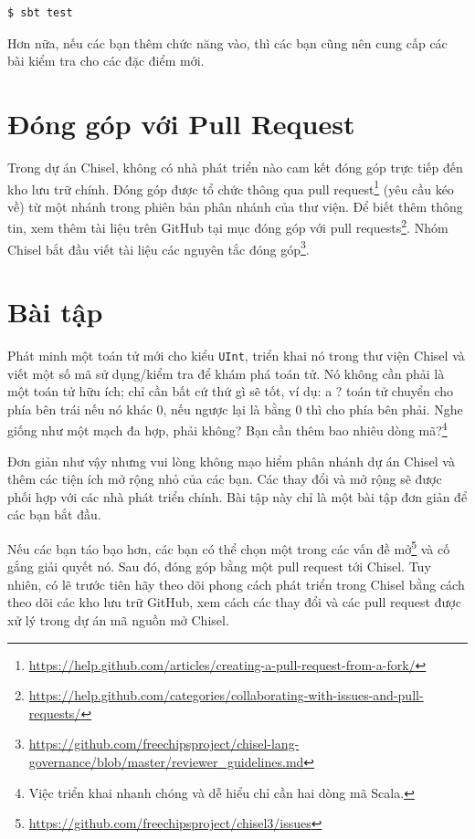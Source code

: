 \documentclass[%
    10pt,
    headinclude, footexclude,
    openright, %
    notitlepage,
    cleardoubleempty,
    headsepline,
    pointlessnumbers,
    bibtotoc, idxtotoc,
    ]{scrbook}
\newcommand{\code}[1]{{\small{\texttt{#1}}}}
\newcommand{\myref}[2]{\href{#1}{#2}}
\renewcommand{\myref}[2]{{#2}{\footnote{\url{#1}}}}
\begin{document}
\begin{verbatim}
$ sbt test
\end{verbatim}

Hơn nữa, nếu các bạn thêm chức năng vào, thì các bạn cũng nên cung cấp các bài kiểm tra cho các đặc điểm mới.

\section{Đóng góp với Pull Request}

Trong dự án Chisel, không có nhà phát triển nào cam kết đóng góp trực tiếp đến kho lưu trữ chính. Đóng góp được tổ chức thông qua 
\myref{https://help.github.com/articles/creating-a-pull-request-from-a-fork/}{pull request} (yêu cầu kéo về)
từ một nhánh trong phiên bản phân nhánh của thư viện.
Để biết thêm thông tin, xem thêm tài liệu trên GitHub tại mục
\myref{https://help.github.com/categories/collaborating-with-issues-and-pull-requests/}{đóng góp với pull requests}.
Nhóm Chisel bắt đầu viết tài liệu 
\myref{https://github.com/freechipsproject/chisel-lang-governance/blob/master/reviewer_guidelines.md}{các nguyên tắc đóng góp}.

\section{Bài tập}

Phát minh một toán tử mới cho kiểu \code{UInt}, triển khai nó trong thư viện Chisel và viết một số mã sử dụng/kiểm tra để khám phá toán tử. Nó không cần phải là một toán tử hữu ích; chỉ cần bất cứ thứ gì sẽ tốt, ví dụ: a ? toán tử chuyển cho phía bên trái nếu nó khác 0, nếu ngược lại là bằng 0 thì cho phía bên phải. Nghe giống như một mạch đa hợp, phải không? Bạn cần thêm bao nhiêu dòng mã?\footnote{Việc triển khai nhanh chóng và dễ hiểu chỉ cần hai dòng mã Scala.}

Đơn giản như vậy nhưng vui lòng không mạo hiểm phân nhánh dự án Chisel và thêm các tiện ích mở rộng nhỏ của các bạn. Các thay đổi và mở rộng sẽ được phối hợp với các nhà phát triển chính. Bài tập này chỉ là một bài tập đơn giản để các bạn bắt đầu.

Nếu các bạn táo bạo hơn, các bạn có thể chọn một trong các \myref{https://github.com/freechipsproject/chisel3/issues}{vấn đề mở} và cố gắng giải quyết nó. Sau đó, đóng góp bằng một pull request tới Chisel. Tuy nhiên, có lẽ trước tiên hãy theo dõi phong cách phát triển trong Chisel bằng cách theo dõi các kho lưu trữ GitHub, xem cách các thay đổi và các pull request được xử lý trong dự án mã nguồn mở Chisel. 
\end{document}
